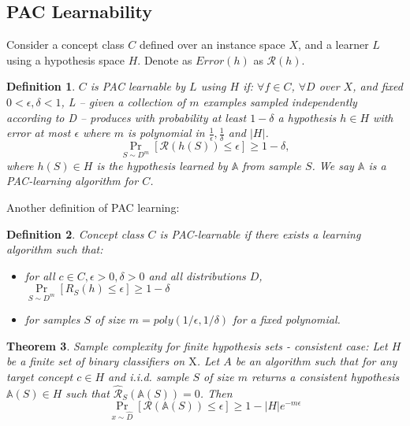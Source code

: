 \documentclass[12pt, a4paper, oneside]{article}
\newtheorem{theorem}{Theorem}[section]
\newtheorem{definition}[theorem]{Definition}
\begin{document}
\subsection{PAC Learnability}
Consider a concept class $C$ defined over an instance space $X$, and a learner $L$
using a hypothesis space $H$. Denote as $Error(h)$ as $\mathcal{R}(h)$. 
\begin{definition}
    $C$ is PAC learnable by $L$ using $H$ if:
    $\forall f \in C$, $\forall D$ over $X$, and fixed $0 < \epsilon, \delta < 1$, L – given a collection of $m$ examples sampled independently according to D – produces with probability at 
    least $1 - \delta$ a hypothesis $h \in H$ with error at most $\epsilon$ where $m$ is polynomial in $\frac{1}{\epsilon}, \frac{1}{\delta}$ and $|H|$.
    \begin{equation*}
        \operatorname{Pr}_{S \sim D^m}[\mathcal{R}(h(S)) \leq \epsilon] \geq 1- \delta,
    \end{equation*}
    where $h(S) \in H$ is the hypothesis learned by $\mathbb{A}$ from sample $S$. We say $\mathbb{A}$ is a PAC-learning algorithm for $C$.
\end{definition}
Another definition of PAC learning:
\begin{definition}
    Concept class $C$ is PAC-learnable if there exists a learning algorithm such that:
    \begin{itemize}
        \item for all $c \in C, \epsilon > 0, \delta > 0$ and all distributions $D$, $\underset{S \sim D^{m}}{\operatorname{Pr}}[R_{S}(h) \leq \epsilon] \geq 1-\delta$
        \item for samples $S$ of size $m = poly(1/\epsilon, 1/\delta)$ for a fixed polynomial.
    \end{itemize}
\end{definition}

\begin{theorem}
    Sample complexity for finite hypothesis sets - consistent case: 
    Let $H$ be a finite set of binary classifiers on $\mathrm{X}$. Let $A$ be an algorithm 
such that for any target concept $c \in H$ and i.i.d. sample $S$ of size $m$ returns a 
consistent hypothesis $\mathbb{A}(S) \in H$ such that $\widehat{\mathcal{R}}_S(\mathbb{A}(S))=0$. Then 
\begin{equation*}
    \operatorname{Pr}_{x \sim \widehat{D}}[\mathcal{R}(\mathbb{A}(S)) \leq \epsilon] \geq 1- |H|e^{-m\epsilon}
\end{equation*}
\end{theorem}


\newpage


\end{document}
